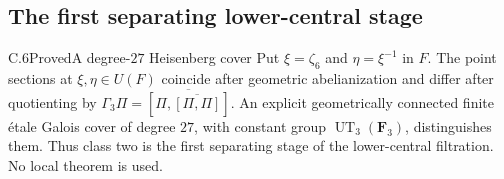 \subsection{The first separating lower-central stage}

\begin{statement}{C.6}{Proved}{A degree-$27$ Heisenberg cover}
Put $\xi=\zeta_6$ and $\eta=\xi^{-1}$ in $F$.
The point sections at $\xi,\eta\in U(F)$ coincide after geometric
abelianization and differ after quotienting by
$\Gamma_3\Pi=\overline{[\Pi,\overline{[\Pi,\Pi]}]}$.
An explicit geometrically connected finite \'etale Galois cover of
degree $27$, with constant group $\operatorname{UT}_3(\mathbf F_3)$,
distinguishes them. Thus class two is the first separating stage
of the lower-central filtration. No local theorem is used.
\end{statement}
